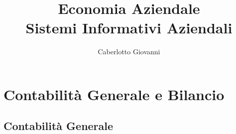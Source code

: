 \documentclass{report}
\title{\Huge{Economia Aziendale}\\Sistemi Informativi Aziendali}
\author{\huge{Caberlotto Giovanni}}
\date{}
\begin{document}
\maketitle
\newpage%
\tableofcontents
\pagebreak

\chapter{Contabilità Generale e Bilancio} %
\label{chap:Contabilità Generale e Bilancio}

\section{Contabilità Generale} %
\label{sec:Contabilità Generale}
\end{document}
